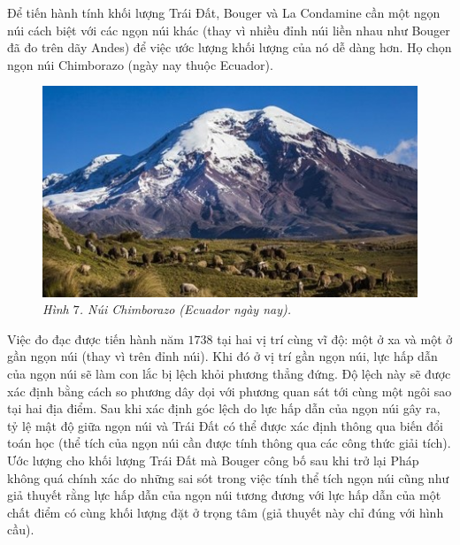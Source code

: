 \begin{multicols}{2}
	\vskip 0.1cm
	Để tiến hành tính khối lượng Trái Đất, Bouger và La Condamine cần một ngọn núi cách biệt với các ngọn núi khác (thay vì nhiều đỉnh núi liền nhau như Bouger đã đo trên dãy Andes) để việc ước lượng khối lượng của nó dễ dàng hơn. Họ chọn ngọn núi Chimborazo (ngày nay thuộc Ecuador).
	\begin{figure}[H]
		\vspace*{5pt}
		\centering
		\captionsetup{labelformat= empty, justification=centering}
		\includegraphics[width =1\linewidth]{8}
		\caption{\small\textit{\color{timhieukhoahoc}Hình $7$. Núi Chimborazo (Ecuador ngày nay).}}
		\vspace*{-10pt}
	\end{figure}
	Việc đo đạc được tiến hành năm $1738$ tại hai vị trí cùng vĩ độ: một ở xa và một ở gần ngọn núi (thay vì trên đỉnh núi). Khi đó ở vị trí gần ngọn núi, lực hấp dẫn của ngọn núi sẽ làm con lắc bị lệch khỏi phương thẳng đứng. Độ lệch này sẽ được xác định bằng cách so phương dây dọi với phương quan sát tới cùng một ngôi sao tại hai địa điểm. Sau khi xác định góc lệch do lực hấp dẫn của ngọn núi gây ra, tỷ lệ mật độ giữa ngọn núi và Trái Đất có thể được xác định thông qua biến đổi toán học (thể tích của ngọn núi cần được tính thông qua các công thức giải tích). Ước lượng cho khối lượng Trái Đất mà Bouger công bố sau khi trở lại Pháp không quá chính xác do những sai sót trong việc tính thể tích ngọn núi cũng như giả thuyết rằng lực hấp dẫn của ngọn núi tương đương với lực hấp dẫn của một chất điểm có cùng khối lượng đặt ở trọng tâm (giả thuyết này chỉ đúng với hình cầu).
	\begin{figure}[H]
		\vspace*{-5pt}
		\centering
		\captionsetup{labelformat= empty, justification=centering}

\end{figure}
\end{multicols}
